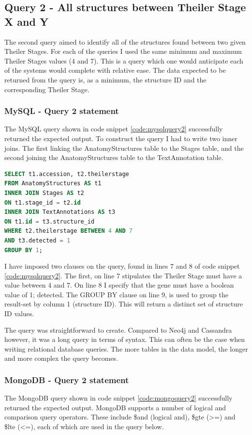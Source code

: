 \subsection*{Query 2 - All structures between Theiler Stage X and Y}\label{query2}
The second query aimed to identify all of the structures found between two given Theiler Stages. For each of the queries I used the same minimum and maximum Theiler Stages values (4 and 7). This is a query which one would anticipate each of the systems would complete with relative ease. The data expected to be returned from the query is, as a minimum, the structure ID and the corresponding Theiler Stage. 

\subsubsection*{MySQL - Query 2 statement}\label{mysqlquery2statement}
The MySQL query shown in code snippet \ref{code:mysqlquery2} successfully returned the expected output. To construct the query I had to write two inner joins. The first linking the AnatomyStructures table to the Stages table, and the second joining the AnatomyStructures table to the TextAnnotation table.

\begin{lstlisting}[language=SQL, caption=MySQL query 2 statement. All structures between Theiler Stage X and Y., label=code:mysqlquery2]
SELECT t1.accession, t2.theilerstage
FROM AnatomyStructures AS t1
INNER JOIN Stages AS t2
ON t1.stage_id = t2.id
INNER JOIN TextAnnotations AS t3
ON t1.id = t3.structure_id
WHERE t2.theilerstage BETWEEN 4 AND 7
AND t3.detected = 1
GROUP BY 1;
\end{lstlisting}

I have imposed two clauses on the query, found in lines 7 and 8 of code snippet \ref{code:mysqlquery2}. The first, on line 7 stipulates the Theiler Stage must have a value between 4 and 7. On line 8 I specify that the gene must have a boolean value of 1; detected. The GROUP BY clause on line 9, is used to group the result-set by column 1 (structure ID). This will return a distinct set of structure ID values.

The query was straightforward to create. Compared to Neo4j and Cassandra however, it was a long query in terms of syntax. This can often be the case when writing relational database queries. The more tables in the data model, the longer and more complex the query becomes.

\subsubsection*{MongoDB - Query 2 statement}\label{mongoquery2statement}
The MongoDB query shown in code snippet \ref{code:mongoquery2} successfully returned the expected output. MongoDB supports a number of logical and comparison query operators. These include \$and (logical and), \$gte (>=) and \$lte (<=), each of which are used in the query below.

